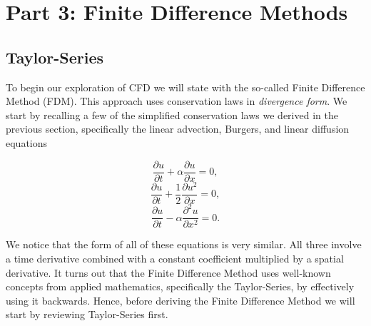 \part{Part 3: Finite Difference Methods}


\chapter{Taylor-Series}
To begin our exploration of CFD we will state with the so-called Finite Difference Method (FDM). This approach uses conservation laws in {\it divergence form}. We start by recalling a few of the simplified conservation laws we derived in the previous section, specifically the linear advection, Burgers, and linear diffusion equations
\begin{eqBox}
\begin{equation}
	\frac{\partial u}{\partial t} +  \alpha \frac{\partial u}{\partial x} = 0,
\end{equation}
\begin{equation}
	\frac{\partial u}{\partial t} +  \frac{1}{2} \frac{\partial u^2}{\partial x} = 0,
\end{equation}
\begin{equation}
	\frac{\partial u}{\partial t} - \alpha \frac{\partial^2 u}{\partial x^2} = 0.
\end{equation}
\end{eqBox}
We notice that the form of all of these equations is very similar. All three involve a time derivative combined with a constant coefficient multiplied by a spatial derivative. It turns out that the Finite Difference Method uses well-known concepts from applied mathematics, specifically the Taylor-Series, by effectively using it backwards. Hence, before deriving the Finite Difference Method we will start by reviewing Taylor-Series first.

